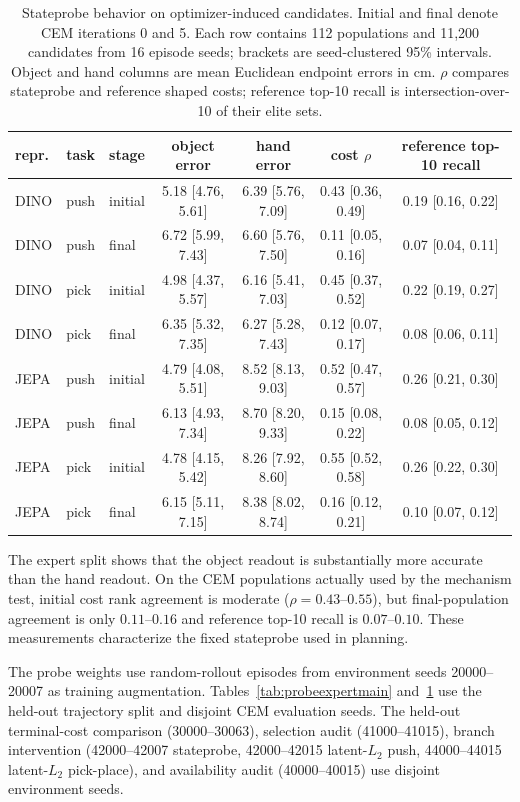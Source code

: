 \documentclass[10pt]{article}
\begin{document}
\begin{table}[ht]
\centering
\scriptsize
\caption{Stateprobe behavior on optimizer-induced candidates. Initial and
final denote CEM iterations 0 and 5. Each row contains 112 populations and
11,200 candidates from 16 episode seeds; brackets are seed-clustered 95\%
intervals. Object and hand columns are mean Euclidean endpoint errors in cm.
$\rho$ compares stateprobe and reference shaped costs; reference top-10 recall
is intersection-over-10 of their elite sets.}
\label{tab:probecem}
\begin{tabular}{lllcccc}
\toprule
repr. & task & stage & object error & hand error & cost $\rho$ &
reference top-10 recall \\
\midrule
DINO & push & initial & 5.18 [4.76, 5.61] & 6.39 [5.76, 7.09] &
0.43 [0.36, 0.49] & 0.19 [0.16, 0.22] \\
DINO & push & final & 6.72 [5.99, 7.43] & 6.60 [5.76, 7.50] &
0.11 [0.05, 0.16] & 0.07 [0.04, 0.11] \\
DINO & pick & initial & 4.98 [4.37, 5.57] & 6.16 [5.41, 7.03] &
0.45 [0.37, 0.52] & 0.22 [0.19, 0.27] \\
DINO & pick & final & 6.35 [5.32, 7.35] & 6.27 [5.28, 7.43] &
0.12 [0.07, 0.17] & 0.08 [0.06, 0.11] \\
JEPA & push & initial & 4.79 [4.08, 5.51] & 8.52 [8.13, 9.03] &
0.52 [0.47, 0.57] & 0.26 [0.21, 0.30] \\
JEPA & push & final & 6.13 [4.93, 7.34] & 8.70 [8.20, 9.33] &
0.15 [0.08, 0.22] & 0.08 [0.05, 0.12] \\
JEPA & pick & initial & 4.78 [4.15, 5.42] & 8.26 [7.92, 8.60] &
0.55 [0.52, 0.58] & 0.26 [0.22, 0.30] \\
JEPA & pick & final & 6.15 [5.11, 7.15] & 8.38 [8.02, 8.74] &
0.16 [0.12, 0.21] & 0.10 [0.07, 0.12] \\
\bottomrule
\end{tabular}
\end{table}

The expert split shows that the object readout is substantially more accurate
than the hand readout. On the CEM populations actually used by the mechanism
test, initial cost rank agreement is moderate
($\rho=0.43$--$0.55$), but final-population agreement is only
$0.11$--$0.16$ and reference top-10 recall is $0.07$--$0.10$.
These measurements characterize the fixed stateprobe used in planning.

The probe weights use random-rollout episodes from environment seeds
20000--20007 as training augmentation. Tables~\ref{tab:probeexpertmain}
and~\ref{tab:probecem} use the held-out trajectory split and disjoint CEM
evaluation seeds. The held-out terminal-cost comparison
(30000--30063), selection audit (41000--41015), branch intervention
(42000--42007 stateprobe, 42000--42015 latent-$L_2$ push, 44000--44015
latent-$L_2$ pick-place), and availability audit (40000--40015) use disjoint
environment seeds.
\end{document}

